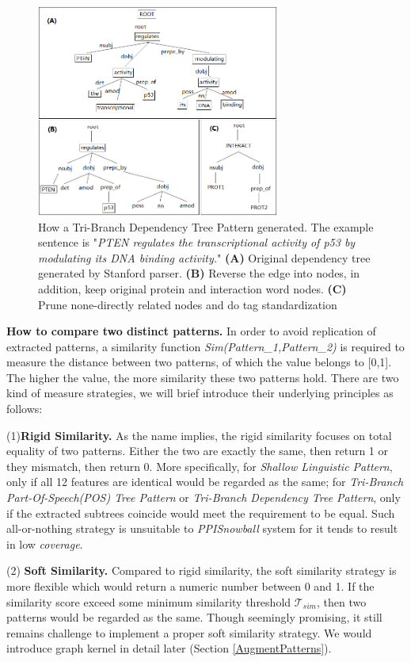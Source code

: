 \begin{flushleft}
\begin{figure}
\includegraphics[width=80mm]{fig/figure6.png}
\caption{How a Tri-Branch Dependency Tree Pattern generated. The example sentence is "\emph{PTEN regulates the transcriptional activity of p53 by modulating its DNA binding activity.}" \textbf{(A)} Original dependency tree generated by Stanford parser. \textbf{(B)} Reverse the edge into nodes, in addition, keep original protein and interaction word nodes. \textbf{(C)} Prune none-directly related nodes and do tag standardization}
\label{fig:deptree}
\end{figure}
\end{flushleft}

\textbf{How to compare two distinct patterns. } In order to avoid replication of extracted patterns, a similarity function \emph{Sim(Pattern\_1,Pattern\_2)} is required to measure the distance between two patterns, of which the value belongs to [0,1]. The higher the value, the more similarity these two patterns hold. There are two kind of measure strategies, we will brief introduce their underlying principles as follows:

(1)\textbf{Rigid Similarity.} As the name implies, the rigid similarity focuses on total equality of two patterns. Either the two are exactly the same, then return 1 or they mismatch, then return 0. More specifically, for \emph{Shallow Linguistic Pattern}, only if all 12 features are identical would be regarded as the same; for \emph{Tri-Branch Part-Of-Speech(POS) Tree Pattern} or \emph{Tri-Branch Dependency Tree Pattern}, only if the extracted subtrees coincide would meet the requirement to be equal. Such all-or-nothing strategy is unsuitable to \emph{PPISnowball} system for it tends to result in low \emph{coverage}.

(2) \textbf{Soft Similarity.} Compared to rigid similarity, the soft similarity strategy is more flexible which would return a numeric number between 0 and 1. If the similarity score exceed some minimum similarity threshold $\mathcal {T}_{sim}$, then two patterns would be regarded as the same. Though seemingly promising, it still remains challenge to implement a proper soft similarity strategy. We would introduce graph kernel in detail later (Section \ref{AugmentPatterns}).


